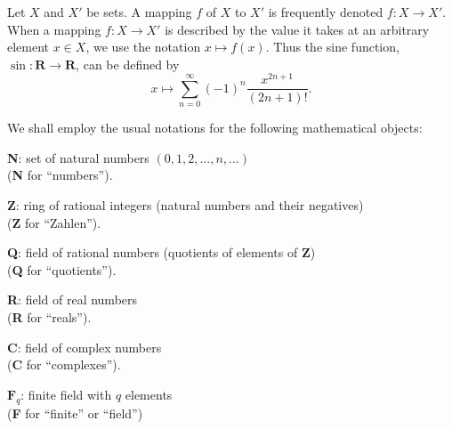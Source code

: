 Let $X$ and $X'$ be sets. A mapping $f$ of $X$ to $X'$ is frequently
denoted $f:X\to X'$. When a mapping $f:X\to X'$ is described by the value it
takes at an arbitrary element $x\in X$, we use the notation $x\mapsto f(x)$.
Thus the sine function, $\sin:\mathbf{R}\to\mathbf{R}$, can be defined by
\[
x\mapsto\sum_{n=0}^{\infty}(-1)^{n}\frac{x^{2n+1}}{(2n+1)!}.
\]

We shall employ the usual notations for the following mathematical objects:

\noindent\textbf{N}: set of natural numbers $(0,1,2,\ldots,n,\ldots)$\\
\hspace*{2.5em}(\textbf{N} for ``numbers'').\par
\vspace{2pt}
\noindent\textbf{Z}: ring of rational integers (natural numbers and their
negatives)\\
\hspace*{2.5em}(\textbf{Z} for ``Zahlen'').\par
\vspace{2pt}
\noindent\textbf{Q}: field of rational numbers (quotients of elements of
\textbf{Z})\\
\hspace*{2.5em}(\textbf{Q} for ``quotients'').\par
\vspace{2pt}
\noindent\textbf{R}: field of real numbers\\
\hspace*{2.5em}(\textbf{R} for ``reals'').\par
\vspace{2pt}
\noindent\textbf{C}: field of complex numbers\\
\hspace*{2.5em}(\textbf{C} for ``complexes'').\par
\vspace{2pt}
\noindent$\mathbf{F}_{q}$: finite field with $q$ elements\\
\hspace*{2.5em}(\textbf{F} for ``finite'' or ``field'')\par
